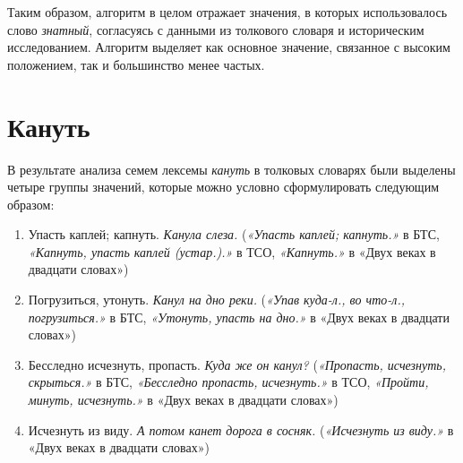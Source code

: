 Таким образом, алгоритм в целом отражает значения, в которых использовалось
слово \textit{знатный}, согласуясь с данными из толкового словаря и историческим исследованием.
Алгоритм выделяет как основное значение, связанное с высоким положением, так и большинство
менее частых.

\section*{Кануть}

В результате анализа семем лексемы \textit{кануть} в толковых словарях были выделены четыре группы значений,
которые можно условно сформулировать следующим образом:

\begin{enumerate}
    \item Упасть каплей; капнуть. \textit{Канула слеза.}
    (\textit{«Упасть каплей; капнуть.»} в БТС,
    \textit{«Капнуть, упасть каплей (устар.).»} в ТСО,
    \textit{«Капнуть.»} в «Двух веках в двадцати словах»)

    \item Погрузиться, утонуть. \textit{Канул на дно реки.}
    (\textit{«Упав куда-л., во что-л., погрузиться.»} в БТС,
    \textit{«Утонуть, упасть на дно.»} в «Двух веках в двадцати словах»)

    \item Бесследно исчезнуть, пропасть. \textit{Куда же он канул?}
    (\textit{«Пропасть, исчезнуть, скрыться.»} в БТС,
    \textit{«Бесследно пропасть, исчезнуть.»} в ТСО,
    \textit{«Пройти, минуть, исчезнуть.»} в «Двух веках в двадцати словах»)

    \item Исчезнуть из виду. \textit{А потом канет дорога в сосняк.}
    (\textit{«Исчезнуть из виду.»} в «Двух веках в двадцати словах»)
\end{enumerate}

%

